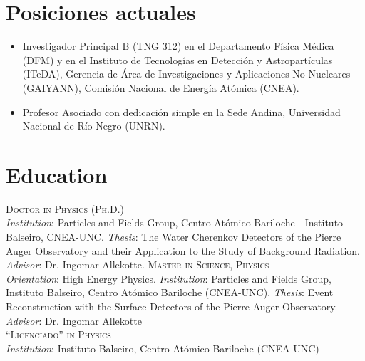 \section*{Posiciones actuales}
\begin{itemize}
    \item Investigador Principal B (TNG 312) en el Departamento Física Médica (DFM) y en el Instituto de Tecnologías en Detección y Astropartículas (ITeDA), Gerencia de Área de Investigaciones y Aplicaciones No Nucleares (GAIYANN), Comisión Nacional de Energía Atómica (CNEA).
	\item Profesor Asociado con dedicación simple en la Sede Andina, Universidad Nacional de Río Negro (UNRN).
\end{itemize}
\fi

\ifeng
\section*{Education}
\noindent
{}\textsc{Doctor in Physics (Ph.D.)}\\
{\emph{Institution}}: Particles and Fields Group, Centro Atómico Bariloche - Instituto Balseiro, CNEA-UNC. {\emph{Thesis}}: The Water Cherenkov Detectors of the Pierre Auger Observatory and their Application to the Study of Background Radiation. {\emph{Advisor}}: Dr. Ingomar Allekotte.
\textsc{Master in Science, Physics}\\
{\emph{Orientation}}: High Energy Physics. {\emph{Institution}}: Particles and Fields Group, Instituto Balseiro, Centro Atómico Bariloche (CNEA-UNC). {\emph{Thesis}}: Event Reconstruction with the Surface Detectors of the Pierre Auger Observatory. {\emph{Advisor}}: Dr. Ingomar Allekotte\\
\textsc{``Licenciado'' in Physics}\\
{\emph{Institution}}: Instituto Balseiro, Centro Atómico Bariloche (CNEA-UNC)\\
\else
